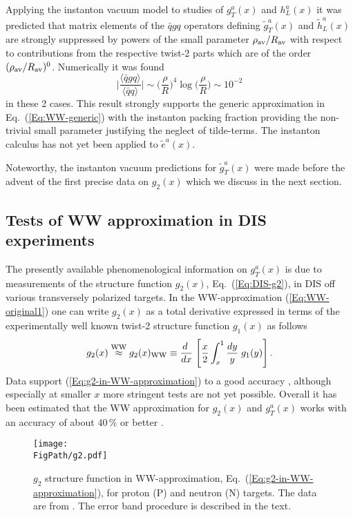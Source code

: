 \documentclass[a4paper,11pt]{article}
\newcommand{\be}{\begin{equation}}
\newcommand{\ee}{\end{equation}}
\newcommand{\la}{\langle}
\newcommand{\ra}{\rangle}
\newcommand*{\FigPath}{./figs}%
\begin{document}
Applying the instanton vacuum model to studies of $g_T^a(x)$ and $h_L^a(x)$
it was predicted that matrix elements of the $\bar qgq$ operators defining 
$\tilde{g}_T^a(x)$ \cite{Balla:1997hf} and $\tilde{h}_L^a(x)$ 
\cite{Dressler:1999hc} are strongly suppressed by powers of the small
parameter $\rho_{\rm av}/R_{\rm av}$ with respect to contributions from the 
respective twist-2 parts which are of the order $(\rho_{\rm av}/R_{\rm av})^0$. 
Numerically it was found 
\be\label{Eq:WW-instanoton}
	\biggl|\frac{\la\bar{q}gq\ra}{\la\bar{q}q\ra}\biggr| \sim 
	\biggl(\frac{\rho}{R}\biggr)^{\!4} \log\biggl(\frac{\rho}{R}\biggr)
	\sim 10^{-2}
\ee
in these 2 cases. This result strongly supports the generic approximation
in Eq.~(\ref{Eq:WW-generic}) with the instanton packing fraction providing 
the non-trivial small parameter justifying the neglect of tilde-terms. 
The instanton calculus has not yet been applied to $\tilde{e}^a(x)$.

Noteworthy, the instanton vacuum predictions for $\tilde{g}_T^a(x)$
were made before the advent of the first precise data on $g_2(x)$
which we discuss in the next section.

\newpage
\subsection{Tests of WW approximation in DIS experiments}
\label{Sec-3.4:WW-classic-experiment}

The presently available phenomenological information on $g_T^a(x)$ is due 
to measurements of the structure function $g_2(x)$, Eq.~(\ref{Eq:DIS-g2}),
in DIS off various transversely polarized targets. In the WW-approximation 
(\ref{Eq:WW-original1}) one can write $g_2(x)$ as a total derivative
expressed in terms of the experimentally well known twist-2
structure function $g_1(x)$ as follows
\be
    	g_2(x) \stackrel{\rm WW}{\approx} g_2(x)_{\rm WW} \equiv
	\frac{ d\;}{ d x}\;\Biggl[\frac{x}{2}\int_x^1\frac{ d y}{y}
	\;g_1(y)\Biggr]\,.\label{Eq:g2-in-WW-approximation}
\ee
Data support (\ref{Eq:g2-in-WW-approximation}) to a good accuracy
\cite{Anthony:2002hy,Abe:1998wq}, although especially at smaller 
$x$ more stringent tests are not yet possible. Overall it has been
estimated that the WW approximation for $g_2(x)$ and $g_T^a(x)$ works 
with an accuracy of about $40\,\%$ or better \cite{Accardi:2009au}. 

\begin{figure}[t!]
\centering
\texttt{[image: \\FigPath/g2.pdf]} 
\caption{\label{Fig:g2} 
$g_{2}$ structure function in  WW-approximation, 
Eq.~(\ref{Eq:g2-in-WW-approximation}), for proton (P) and neutron (N)
targets. The data are from \cite{Anthony:2002hy,Abe:1998wq}.
The error band procedure is described in the text.}
\end{figure}
\end{document}
